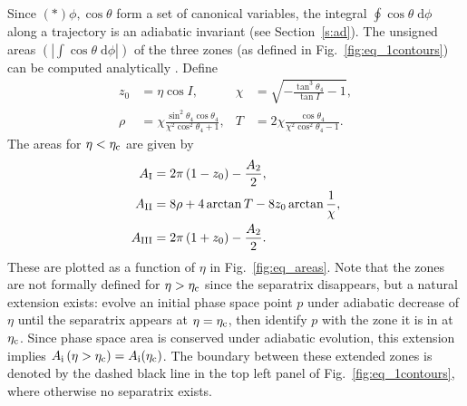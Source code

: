\documentclass[
        fleqn,
        usenatbib,
        referee,
    ]{mnras}
\newcommand*{\abs}[1]{\left|#1\right|}
\newcommand*{\p}[1]{\left(#1\right)}
\begin{document}
Since $\p*{\phi, \cos \theta}$ form a set of canonical variables, the integral
$\oint \cos \theta\;\mathrm{d}\phi$ along a trajectory is an adiabatic invariant
(see Section~\autoref{s:ad}). The unsigned areas $\p{\abs{\int \cos \theta
\;\mathrm{d}\phi}}$ of the three zones (as defined in
Fig.~\autoref{fig:eq_1contours}) can be computed analytically
\citep{henrard1987,ward2004I}. Define
\begin{subequations}
    \begin{align}
        z_0 &= \eta\cos I, &
        \chi &= \sqrt{-\frac{\tan^3\theta_4}{\tan I} - 1},\\
        \rho &= \chi \frac{\sin^2 \theta_4\cos \theta_4}{
            \chi^2 \cos^2\theta_4 + 1},&
        T &= 2\chi \frac{\cos \theta_4}{
            \chi^2 \cos^2\theta_4 - 1}.
    \end{align}
\end{subequations}
The areas for $\eta < \eta_{\rm c}$ are given by
\begin{subequations}\label{se:area_ward}
    \begin{align}
        A_{\rm I} &= 2\pi\p{1 - z_0} - \frac{A_2}{2},\\
        A_{\rm II} &= 8\rho + 4\arctan T - 8z_0 \arctan \frac{1}{\chi},\\
        A_{\rm III} &= 2\pi\p{1 + z_0} - \frac{A_2}{2}.
    \end{align}
\end{subequations}
These are plotted as a function of $\eta$ in Fig.~\ref{fig:eq_areas}. Note that
the zones are not formally defined for $\eta > \eta_{\rm c}$ since the
separatrix disappears, but a natural extension exists: evolve an initial phase
space point $p$ under adiabatic decrease of $\eta$ until the separatrix appears
at $\eta = \eta_{\rm c}$, then identify $p$ with the zone it is in at $\eta_{\rm
c}$. Since phase space area is conserved under adiabatic evolution, this
extension implies $A_{\rm i}\p{\eta > \eta_{\rm c}} = A_{\rm i}(\eta_{\rm c})$.
The boundary between these extended zones is denoted by the dashed black line in
the top left panel of Fig.~\ref{fig:eq_1contours}, where otherwise no separatrix
exists.
\end{document}
